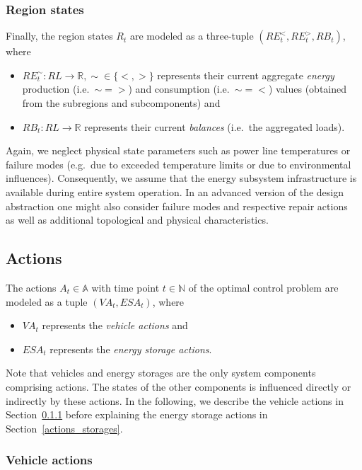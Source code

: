 \subsubsection{Region states}
\label{states_regions}

Finally, the region states $R_t$ are modeled as a three-tuple $(RE_t^<, RE_t^>, RB_t)$, where
\begin{itemize}
	\item $RE_t^\sim: RL \rightarrow \mathbb{R}, \sim \in \{<,>\}$ represents their current aggregate \textit{energy} production (i.e.\ $\sim = >$) and consumption (i.e.\ $\sim = <$) values (obtained from the subregions and subcomponents) and
	\item $RB_t: RL \rightarrow \mathbb{R}$ represents their current \textit{balances} (i.e.\ the aggregated loads).
\end{itemize}
Again, we neglect physical state parameters such as power line temperatures or failure modes (e.g.\ due to exceeded temperature limits or due to environmental influences). Consequently, we assume that the energy subsystem infrastructure is available during entire system operation. In an advanced version of the design abstraction one might also consider failure modes and respective repair actions~\cite{anghel2007stochastic} as well as additional topological and physical characteristics.

\subsection{Actions}
\label{actions}

The actions $A_t \in \mathbb{A}$ with time point $t \in \mathbb{N}$ of the optimal control problem are modeled as a tuple $(VA_t, ESA_t)$, where
\begin{itemize}
	\item $VA_t$ represents the \textit{vehicle actions} and
	\item $ESA_t$ represents the \textit{energy storage actions}.
\end{itemize}
Note that vehicles and energy storages are the only system components comprising actions. The states of the other components is influenced directly or indirectly by these actions. In the following, we describe the vehicle actions in Section~\ref{actions_vehicles} before explaining the energy storage actions in Section~\ref{actions_storages}.

\subsubsection{Vehicle actions}
\label{actions_vehicles}

